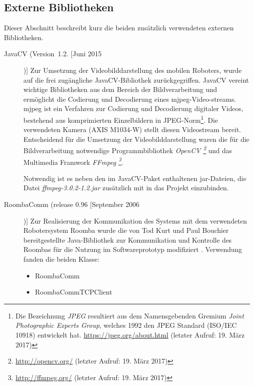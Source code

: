 \subsection{Externe Bibliotheken}
Dieser Abschnitt beschreibt kurz die beiden zusätzlich verwendeten externen Bibliotheken.
\begin{description}
\item[JavaCV (Version~1.2. [Juni 2015])] Zur Umsetzung der Videobilddarstellung des mobilen Roboters, wurde auf die frei zugängliche JavaCV-Bibliothek zurückgegriffen. JavaCV vereint wichtige Bibliotheken aus dem Bereich der Bildverarbeitung und ermöglicht die Codierung und Decodierung eines \acf{mjpeg}-Video-streams. \acs{mjpeg} ist ein Verfahren zur Codierung und Decodierung digitaler Videos, bestehend aus komprimierten Einzelbildern in JPEG-Norm\footnote{Die Bezeichnung \textit{JPEG} resultiert aus dem Namensgebenden Gremium \textit{Joint Photographic Experts Group}, welches 1992 den JPEG Standard (ISO/IEC 10918) entwickelt hat. \url{https://jpeg.org/about.html} (letzter Aufruf: 19. März 2017)}. Die verwendeten Kamera (AXIS M1034-W) stellt diesen Videostream bereit. Entscheidend für die Umsetzung der Videobilddarstellung waren die für die Bildverarbeitung notwendige Programmbibliothek \textit{OpenCV \footnote{\url{http://opencv.org/} (letzter Aufruf: 19. März 2017)}} und das Multimedia Framwork \textit{FFmpeg \footnote{\url{http://ffmpeg.org/} (letzter Aufruf: 19. März 2017)}}. 

Notwendig ist es neben den im JavaCV-Paket enthaltenen jar-Dateien, die Datei \textit{ffmpeg-3.0.2-1.2.jar} zusätzlich mit in das Projekt einzubinden.

\item[RoombaComm (release 0.96 [September 2006])] Zur Realisierung der Kommunikation des Systems mit dem verwendeten Robotersystem Roomba wurde die von Tod Kurt und Paul Bouchier bereitgestellte Java-Bibliothek zur Kommunikation und Kontrolle des Roombas für die Nutzung im Softwareprototyp modifiziert \cite{Kurt2007}.
Verwendung fanden die beiden Klasse:
\begin{itemize}
\item RoombaComm
\item RoombaCommTCPClient
\end{itemize}
\end{description}






